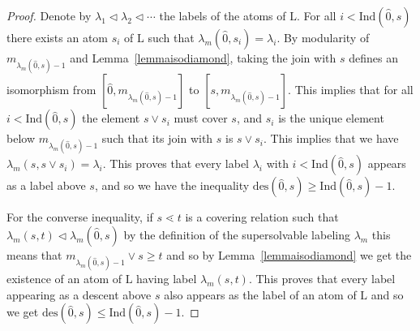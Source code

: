 \documentclass[11pt,a4paper]{amsart}
\theoremstyle{results}
\newtheorem{lemma}[thm]{Lemma}
\theoremstyle{definitions}
\newcommand{\rk}{\operatorname{rk}}
\newcommand{\zero}{\hat{0}}
\newcommand{\des}{\mathrm{des}}
\newcommand{\un}{\hat{1}}
\newcommand{\Latt}{\mathrm{L}}
\newcommand{\Ind}{\mathrm{Ind}}
\renewcommand{\hat}{\widehat}
\begin{document}
\begin{proof}
Denote by $\lambda_1 \vartriangleleft \lambda_2 \vartriangleleft \cdots $ the labels of the atoms of $\Latt.$ For all $i < \Ind(\zero, s)$ there exists an atom $s_i$ of $\Latt$ such that $\lambda_m(\zero, s_i) = \lambda_i$. By modularity of $m_{\lambda_m(\zero,s)-1}$ and Lemma~\ref{lemmaisodiamond}, taking the join with $s$ defines an isomorphism from $[\zero, m_{\lambda_m(\zero,s)-1}]$ to $[s, m_{\lambda_m(\zero,s)-1}]$. This implies that for all $i < \Ind(\zero, s)$ the element $s\vee s_i$ must cover $s$, and $s_i$ is the unique element below $m_{\lambda_m(\zero,s)-1}$ such that its join with $s$ is $s\vee s_i$. This implies that we have $\lambda_m(s, s \vee s_i) = \lambda_i$. This proves that every label $\lambda_i$ with $i < \Ind(\zero, s)$ appears as a label above $s$, and so we have the inequality $\des(\zero, s) \geqslant \Ind(\zero, s) - 1.$ 

For the converse inequality, if $s\lessdot t$ is a covering relation such that $\lambda_m(s,t) \vartriangleleft \lambda_m(\zero, s)$ by the definition of the supersolvable labeling $\lambda_m$ this means that $m_{\lambda_m(\zero,s)-1}\vee s \geqslant t$ and so by Lemma~\ref{lemmaisodiamond} we get the existence of an atom of $\Latt$ having label $\lambda_m(s,t)$. This proves that every label appearing as a descent above $s$ also appears as the label of an atom of $\Latt$ and so we get $\des(\zero, s) \leqslant \Ind(\zero, s) - 1.$
\end{proof}
\end{document}
